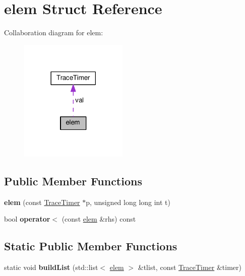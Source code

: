 \hypertarget{structelem}{}\section{elem Struct Reference}
\label{structelem}


Collaboration diagram for elem\+:\nopagebreak
\begin{figure}[H]
\begin{center}
\leavevmode
\includegraphics[width=146pt]{structelem__coll__graph}
\end{center}
\end{figure}
\subsection*{Public Member Functions}
\begin{DoxyCompactItemize}
\item 
\hypertarget{structelem_a1b3c3f35e36509cd5c5d4b58d2cd2c4b}{}{\bfseries elem} (const \hyperlink{classTraceTimer}{Trace\+Timer} $\ast$p, unsigned long long int t)\label{structelem_a1b3c3f35e36509cd5c5d4b58d2cd2c4b}

\item 
\hypertarget{structelem_a63a278276a0c0ba917d363366dfd57b4}{}bool {\bfseries operator$<$} (const \hyperlink{structelem}{elem} \&rhs) const \label{structelem_a63a278276a0c0ba917d363366dfd57b4}

\end{DoxyCompactItemize}
\subsection*{Static Public Member Functions}
\begin{DoxyCompactItemize}
\item 
\hypertarget{structelem_a89030e25e760d130062432961126f9c9}{}static void {\bfseries build\+List} (std\+::list$<$ \hyperlink{structelem}{elem} $>$ \&tlist, const \hyperlink{classTraceTimer}{Trace\+Timer} \&timer)\label{structelem_a89030e25e760d130062432961126f9c9}

\end{DoxyCompactItemize}
